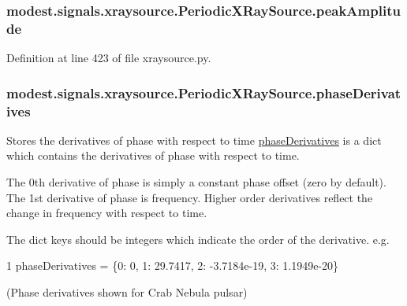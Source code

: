 \subsubsection[{\texorpdfstring{peak\+Amplitude}{peakAmplitude}}]{\setlength{\rightskip}{0pt plus 5cm}modest.\+signals.\+xraysource.\+Periodic\+X\+Ray\+Source.\+peak\+Amplitude}\hypertarget{classmodest_1_1signals_1_1xraysource_1_1PeriodicXRaySource_ab9ca2f0588f7e2f23c5301e05070fe99}{}\label{classmodest_1_1signals_1_1xraysource_1_1PeriodicXRaySource_ab9ca2f0588f7e2f23c5301e05070fe99}


Definition at line 423 of file xraysource.\+py.

\subsubsection[{\texorpdfstring{phase\+Derivatives}{phaseDerivatives}}]{\setlength{\rightskip}{0pt plus 5cm}modest.\+signals.\+xraysource.\+Periodic\+X\+Ray\+Source.\+phase\+Derivatives}\hypertarget{classmodest_1_1signals_1_1xraysource_1_1PeriodicXRaySource_ad885c269b3b042b3d094412683ef3476}{}\label{classmodest_1_1signals_1_1xraysource_1_1PeriodicXRaySource_ad885c269b3b042b3d094412683ef3476}


Stores the derivatives of phase with respect to time  \hyperlink{classmodest_1_1signals_1_1xraysource_1_1PeriodicXRaySource_ad885c269b3b042b3d094412683ef3476}{phase\+Derivatives} is a dict which contains the derivatives of phase with respect to time. 

The 0th derivative of phase is simply a constant phase offset (zero by default). The 1st derivative of phase is frequency. Higher order derivatives reflect the change in frequency with respect to time.

The dict keys should be integers which indicate the order of the derivative. e.\+g. 
\begin{DoxyCode}
1 phaseDerivatives = \{0: 0, 1: 29.7417, 2: -3.7184e-19, 3: 1.1949e-20\}
\end{DoxyCode}
 (Phase derivatives shown for Crab Nebula pulsar) 

